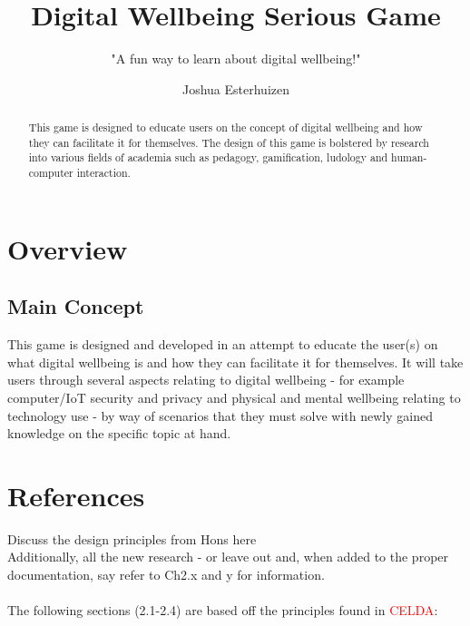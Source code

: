 \documentclass[a4paper]{scrreprt}
\title{Digital Wellbeing Serious Game}
\subtitle{"A fun way to learn about digital wellbeing!"}
\author{Joshua Esterhuizen}
\begin{document}
\maketitle

\newpage

\begin{abstract}
This game is designed to educate users on the concept of digital wellbeing and how they can facilitate it for themselves. The design of this game is bolstered by research into various fields of academia such as pedagogy, gamification, ludology and human-computer interaction.  
\end{abstract}


\chapter{Overview}
\section{Main Concept}
This game is designed and developed in an attempt to educate the user(s) on what digital wellbeing is and how they can facilitate it for themselves. It will take users through several aspects relating to digital wellbeing - for example computer/IoT security and privacy and physical and mental wellbeing relating to technology use - by way of scenarios that they must solve with newly gained knowledge on the specific topic at hand.




\chapter{References} 
Discuss the design principles from Hons here
\\
Additionally, all the new research - or leave out and, when added to the proper documentation, say refer to Ch2.x and y for information.
\\\\
The following sections (2.1-2.4) are based off the principles found in \textcolor{red}{CELDA}:
\end{document}
